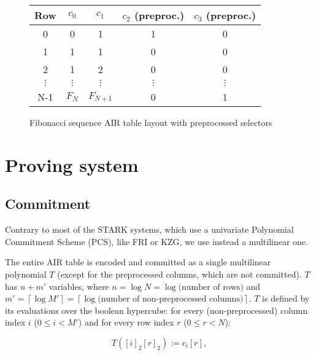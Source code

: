 \documentclass{article}
\newcommand{\Pol}{T}
\begin{document}
\begin{figure}[h!]
\centering
\begin{tabular}{ccccc}
\toprule
Row & $c_0$ & $c_1$ & $c_2$ (preproc.) & $c_3$ (preproc.) \\
\midrule
0 & \cellcolor{blue!10}0 & \cellcolor{blue!10}1 & \cellcolor{orange!10}1 & \cellcolor{orange!10}0 \\
1 & \cellcolor{blue!10}1 & \cellcolor{blue!10}1 & \cellcolor{orange!10}0 & \cellcolor{orange!10}0 \\
2 & \cellcolor{blue!10}1 & \cellcolor{blue!10}2 & \cellcolor{orange!10}0 & \cellcolor{orange!10}0 \\
$\vdots$ & $\vdots$ & $\vdots$ & $\vdots$ & $\vdots$ \\
N-1 & \cellcolor{blue!10}$F_N$ & \cellcolor{blue!10}$F_{N+1}$ & \cellcolor{orange!10}0 & \cellcolor{orange!10}1 \\
\bottomrule
\end{tabular}

\vspace{1em}
\caption{Fibonacci sequence AIR table layout with preprocessed selectors}
\label{fig:fibonacci_air}
\end{figure}

\section{Proving system}

\subsection{{Commitment}}

Contrary to most of the STARK systems, which use a univariate Polynomial Commitment Scheme (PCS), like FRI or KZG, we use instead a multilinear one. 



The entire AIR table is encoded and committed as a single multilinear polynomial $\Pol$ (except for the preprocessed columns, which are not committed). $\Pol$ has $n + m'$ variables, where $n = \log N = \log \text{(number of rows)}$ and $m' = \left\lceil  \log M' \right\rceil = \left\lceil  \log \text{(number of non-preprocessed columns)} \right\rceil$. $\Pol$ is defined by its evaluations over the boolean hypercube: for every (non-preprocessed) column index $i$ ($0 \leq i < M'$) and for every row index $r$ ($0 \leq r < N$): 

$$\Pol([i]_2 [r]_2) := c_{i}[r],$$
\end{document}
